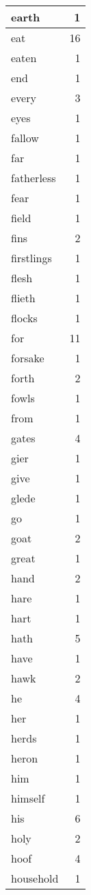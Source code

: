 \begin{center}
\begin{longtable}{l|r}
earth & 1 \\ \hline
eat & 16 \\ \hline
eaten & 1 \\ \hline
end & 1 \\ \hline
every & 3 \\ \hline
eyes & 1 \\ \hline
fallow & 1 \\ \hline
far & 1 \\ \hline
fatherless & 1 \\ \hline
fear & 1 \\ \hline
field & 1 \\ \hline
fins & 2 \\ \hline
firstlings & 1 \\ \hline
flesh & 1 \\ \hline
flieth & 1 \\ \hline
flocks & 1 \\ \hline
for & 11 \\ \hline
forsake & 1 \\ \hline
forth & 2 \\ \hline
fowls & 1 \\ \hline
from & 1 \\ \hline
gates & 4 \\ \hline
gier & 1 \\ \hline
give & 1 \\ \hline
glede & 1 \\ \hline
go & 1 \\ \hline
goat & 2 \\ \hline
great & 1 \\ \hline
hand & 2 \\ \hline
hare & 1 \\ \hline
hart & 1 \\ \hline
hath & 5 \\ \hline
have & 1 \\ \hline
hawk & 2 \\ \hline
he & 4 \\ \hline
her & 1 \\ \hline
herds & 1 \\ \hline
heron & 1 \\ \hline
him & 1 \\ \hline
himself & 1 \\ \hline
his & 6 \\ \hline
holy & 2 \\ \hline
hoof & 4 \\ \hline
household & 1 \\ \hline

\end{longtable}
\end{center}

